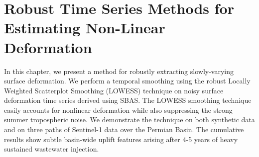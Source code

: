 %



\chapter{Robust Time Series Methods for Estimating Non-Linear Deformation}
\label{CHAP:5-robust-ts}


In this chapter, we present a method for robustly extracting slowly-varying surface deformation.
We perform a temporal smoothing using the robust Locally Weighted Scatterplot Smoothing (LOWESS) technique \citep{Cleveland1979RobustLocallyWeighted} on noisy surface deformation time series derived using SBAS.
The LOWESS smoothing technique easily accounts for nonlinear deformation while also suppressing the strong summer tropospheric noise.
We demonstrate the technique on both synthetic data and on three paths of Sentinel-1 data over the Permian Basin.
The cumulative results show subtle basin-wide uplift features arising after 4-5 years of heavy sustained wastewater injection.



%	

